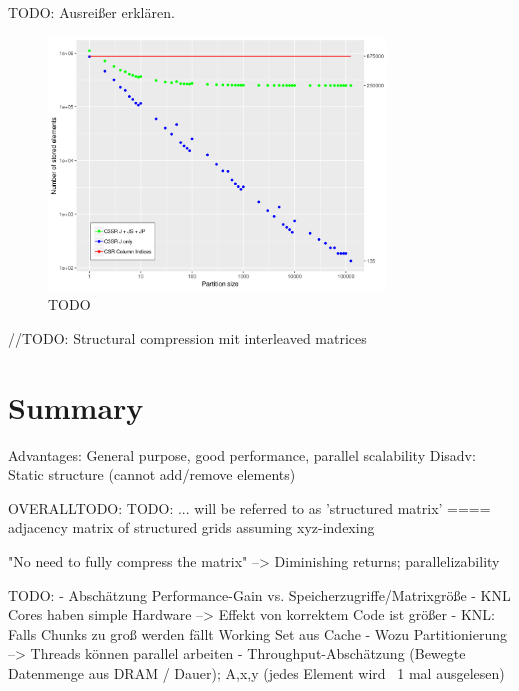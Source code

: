 \documentclass{article}
\begin{document}
    TODO: Ausreißer erklären.
    \begin{figure}[ht]
      \centering
      \includegraphics[width=0.8\textwidth]{fig/structural-compression}
      \caption*{TODO}
    \end{figure}

    //TODO: Structural compression mit interleaved matrices
\section{Summary}
  Advantages: General purpose, good performance, parallel scalability
  Disadv: Static structure (cannot add/remove elements)

OVERALLTODO:
  TODO: ... will be referred to as 'structured matrix' ==== adjacency matrix of structured grids assuming xyz-indexing

  "No need to fully compress the matrix" --> Diminishing returns; parallelizability

  TODO:
    - Abschätzung Performance-Gain vs. Speicherzugriffe/Matrixgröße
    - KNL Cores haben simple Hardware --> Effekt von korrektem Code ist größer
    - KNL: Falls Chunks zu groß werden fällt Working Set aus Cache
    - Wozu Partitionierung --> Threads können parallel arbeiten
    - Throughput-Abschätzung (Bewegte Datenmenge aus DRAM / Dauer); A,x,y (jedes Element wird ~1 mal ausgelesen)

\printbibliography
\end{document}
